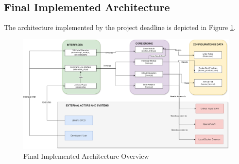 \subsection{Final Implemented Architecture}
The architecture implemented by the project deadline is depicted in Figure \ref{fig:final_architecture}.
\begin{figure}[H] %
    \centering
    \includegraphics[width=1\linewidth]{Figures/FinalUML.png} %
    \caption{Final Implemented Architecture Overview}
    \label{fig:final_architecture} %
\end{figure}

